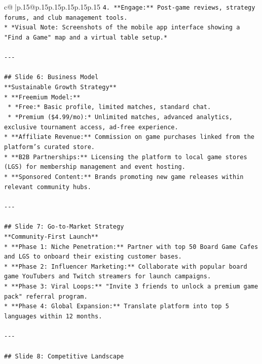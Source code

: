 \documentclass{article}
\begin{document}
{\begin{supertabular}{c@{$\;$}|p{.15\linewidth}@{}p{.15\linewidth}p{.15\linewidth}p{.15\linewidth}p{.15\linewidth}p{.15\linewidth}}
{{{\texttt{4.  **Engage:** Post{-}game reviews, strategy forums, and club management tools.} \\
\texttt{*   *Visual Note: Screenshots of the mobile app interface showing a "Find a Game" map and a virtual table setup.*} \\
\\ 
\texttt{{-}{-}{-}} \\
\\ 
\texttt{\#\# Slide 6: Business Model} \\
\texttt{**Sustainable Growth Strategy**} \\
\texttt{*   **Freemium Model:**} \\
\texttt{    *   *Free:* Basic profile, limited matches, standard chat.} \\
\texttt{    *   *Premium (\$4.99/mo):* Unlimited matches, advanced analytics, exclusive tournament access, ad{-}free experience.} \\
\texttt{*   **Affiliate Revenue:** Commission on game purchases linked from the platform's curated store.} \\
\texttt{*   **B2B Partnerships:** Licensing the platform to local game stores (LGS) for membership management and event hosting.} \\
\texttt{*   **Sponsored Content:** Brands promoting new game releases within relevant community hubs.} \\
\\ 
\texttt{{-}{-}{-}} \\
\\ 
\texttt{\#\# Slide 7: Go{-}to{-}Market Strategy} \\
\texttt{**Community{-}First Launch**} \\
\texttt{*   **Phase 1: Niche Penetration:** Partner with top 50 Board Game Cafes and LGS to onboard their existing customer bases.} \\
\texttt{*   **Phase 2: Influencer Marketing:** Collaborate with popular board game YouTubers and Twitch streamers for launch campaigns.} \\
\texttt{*   **Phase 3: Viral Loops:** "Invite 3 friends to unlock a premium game pack" referral program.} \\
\texttt{*   **Phase 4: Global Expansion:** Translate platform into top 5 languages within 12 months.} \\
\\ 
\texttt{{-}{-}{-}} \\
\\ 
\texttt{\#\# Slide 8: Competitive Landscape} \\
}}}
\end{supertabular}}
\end{document}
